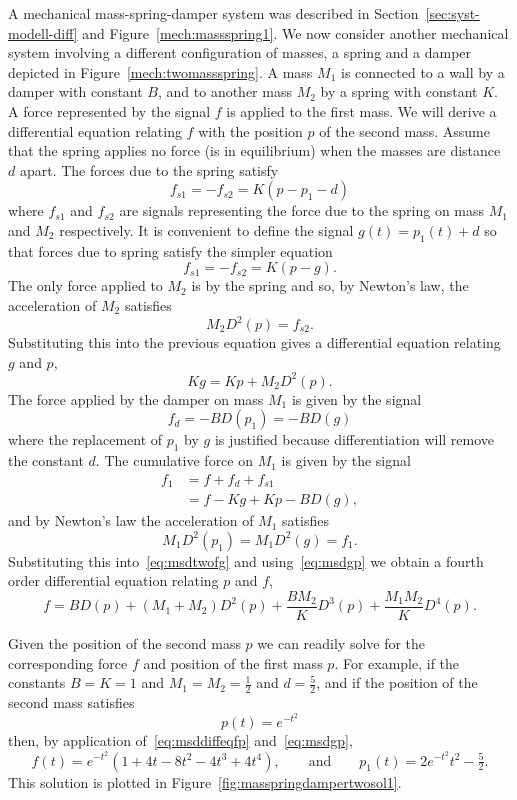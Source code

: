 A mechanical mass-spring-damper system was described in Section~\ref{sec:syst-modell-diff} and Figure~\ref{mech:massspring1}.  We now consider another mechanical system involving a different configuration of masses, a spring and a damper depicted in Figure~\ref{mech:twomassspring}.  A mass $M_1$ is connected to a wall by a damper with constant $B$, and to another mass $M_2$ by a spring with constant $K$.  A force represented by the signal $f$ is applied to the first mass.  We will derive a differential equation relating $f$ with the position $p$ of the second mass.  Assume that the spring applies no force (is in equilibrium) when the masses are distance $d$ apart.  The forces due to the spring satisfy
\[
f_{s1} = -f_{s2} = K( p - p_1 - d)
\] 
where $f_{s1}$ and $f_{s2}$ are signals representing the force due to the spring on mass $M_1$ and $M_2$ respectively.  It is convenient to define the signal $g(t) = p_1(t) + d$ so that forces due to spring satisfy the simpler equation 
\[
f_{s1} = -f_{s2} = K( p - g ).
\]
The only force applied to $M_2$ is by the spring and so, by Newton's law, the acceleration of $M_2$ satisfies
\[
M_2 D^2(p) = f_{s2}.
\]
Substituting this into the previous equation gives a differential equation relating $g$ and $p$,
\begin{equation}\label{eq:msdgp}
K g = K p + M_2 D^2(p).
\end{equation}
The force applied by the damper on mass $M_1$ is given by the signal
\[
f_d = -B D(p_1) = -B D(g)
\] 
where the replacement of $p_1$ by $g$ is justified because differentiation will remove the constant $d$.  The cumulative force on $M_1$ is given by the signal
\begin{align}
f_1 &= f + f_d + f_{s1} \nonumber \\
&= f - Kg  + Kp - B D(g), \label{eq:msdtwofg}
\end{align}
and by Newton's law the acceleration of $M_1$ satisfies
\[
M_1 D^2(p_1) = M_1 D^2(g) = f_1.
\]
Substituting this into~\eqref{eq:msdtwofg} and using~\eqref{eq:msdgp} we obtain a fourth order differential equation relating $p$ and $f$,
\begin{equation}\label{eq:msddiffeqfp}
f = B D(p) + (M_1+M_2) D^2(p) + \frac{B M_2}{K} D^3(p) + \frac{M_1 M_2}{K} D^4(p).
\end{equation}

Given the position of the second mass $p$ we can readily solve for the corresponding force $f$ and position of the first mass $p$.  For example, if the constants $B=K=1$ and $M_1=M_2=\tfrac{1}{2}$ and $d = \tfrac{5}{2}$, and if the position of the second mass satisfies
\[
p(t) = e^{-t^2}
\]
then, by application of~\eqref{eq:msddiffeqfp} and~\eqref{eq:msdgp},
\[
f(t) = e^{-t^2} (1 + 4t - 8 t^2 - 4 t^3 + 4 t^4 ), \qquad \text{and} \qquad p_1(t) = 2 e^{-t^2} t^2 - \tfrac{5}{2}.
\]
This solution is plotted in Figure~\ref{fig:masspringdampertwosol1}.

